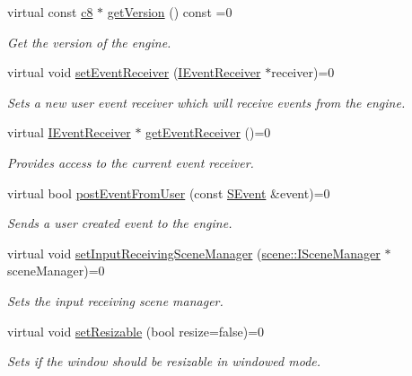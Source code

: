 \begin{DoxyCompactItemize}
virtual const \hyperlink{namespaceirr_a9395eaea339bcb546b319e9c96bf7410}{c8} $\ast$ \hyperlink{classirr_1_1IrrlichtDevice_a4eb5bc1b15f552ce2c37d792231392f7}{get\+Version} () const =0
\begin{DoxyCompactList}\small\item\em Get the version of the engine. \end{DoxyCompactList}\item 
virtual void \hyperlink{classirr_1_1IrrlichtDevice_abf71a5ed6bb6b287e769f699010cedf0}{set\+Event\+Receiver} (\hyperlink{classirr_1_1IEventReceiver}{I\+Event\+Receiver} $\ast$receiver)=0
\begin{DoxyCompactList}\small\item\em Sets a new user event receiver which will receive events from the engine. \end{DoxyCompactList}\item 
virtual \hyperlink{classirr_1_1IEventReceiver}{I\+Event\+Receiver} $\ast$ \hyperlink{classirr_1_1IrrlichtDevice_a26227e20e46915942d067532c61df42b}{get\+Event\+Receiver} ()=0
\begin{DoxyCompactList}\small\item\em Provides access to the current event receiver. \end{DoxyCompactList}\item 
virtual bool \hyperlink{classirr_1_1IrrlichtDevice_abf859e39f017b0403c6ed331e48e01df}{post\+Event\+From\+User} (const \hyperlink{structirr_1_1SEvent}{S\+Event} \&event)=0
\begin{DoxyCompactList}\small\item\em Sends a user created event to the engine. \end{DoxyCompactList}\item 
virtual void \hyperlink{classirr_1_1IrrlichtDevice_a22ab84f23050dbef122f16a33aa9b91d}{set\+Input\+Receiving\+Scene\+Manager} (\hyperlink{classirr_1_1scene_1_1ISceneManager}{scene\+::\+I\+Scene\+Manager} $\ast$scene\+Manager)=0
\begin{DoxyCompactList}\small\item\em Sets the input receiving scene manager. \end{DoxyCompactList}\item 
virtual void \hyperlink{classirr_1_1IrrlichtDevice_a4911502bd085d2d87474ff12959bc341}{set\+Resizable} (bool resize=false)=0
\begin{DoxyCompactList}\small\item\em Sets if the window should be resizable in windowed mode. \end{DoxyCompactList}\item 

\end{DoxyCompactItemize}
